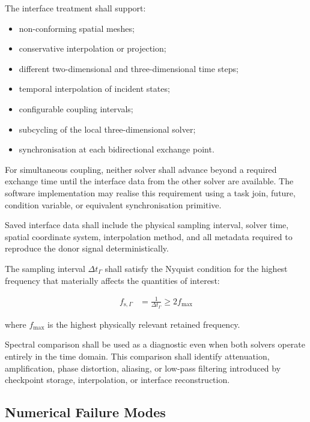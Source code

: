 
The interface treatment shall support:
\begin{itemize}
  \item non-conforming spatial meshes;
  \item conservative interpolation or projection;
  \item different two-dimensional and three-dimensional time steps;
  \item temporal interpolation of incident states;
  \item configurable coupling intervals;
  \item subcycling of the local three-dimensional solver;
  \item synchronisation at each bidirectional exchange point.
\end{itemize}
For simultaneous coupling, neither solver shall advance beyond a required exchange time until the interface data from the other solver are available. The software implementation may realise this requirement using a task join, future, condition variable, or equivalent synchronisation primitive.

Saved interface data shall include the physical sampling interval,
solver time, spatial coordinate system, interpolation method, and all
metadata required to reproduce the donor signal deterministically.

The sampling interval $\Delta t_{\Gamma}$ shall satisfy the Nyquist
condition for the highest frequency that materially affects the
quantities of interest:

\begin{align}
    f_{\mathrm{s},\Gamma}
    &=
    \frac{1}{\Delta t_{\Gamma}}
    \geq
    2 f_{\mathrm{max}}
    \label{eq:res-num-ibc-interface-nyquist-condition}
\end{align}

where $f_{\mathrm{max}}$ is the highest physically relevant retained
frequency.

Spectral comparison shall be used as a diagnostic even when both
solvers operate entirely in the time domain. This comparison shall
identify attenuation, amplification, phase distortion, aliasing, or
low-pass filtering introduced by checkpoint storage, interpolation, or
interface reconstruction.

\subsection{Numerical Failure Modes}
\label{sec:res-num-ibc-numerical-failure-modes}

